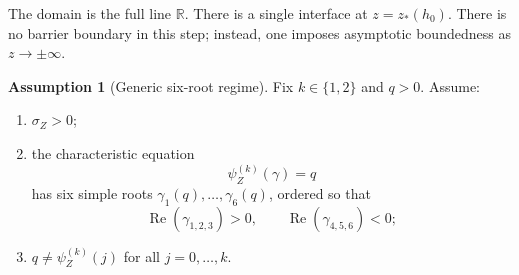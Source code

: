 \documentclass{article}
\newcommand{\R}{\mathbb{R}}
\newcommand{\Rea}{\operatorname{Re}}
\theoremstyle{definition}
\newtheorem{assumption}{Assumption}[section]
\begin{document}
The domain is the full line $\R$. There is a single interface at $z=z_*(h_0)$. There is no barrier boundary in this
step; instead, one imposes asymptotic boundedness as $z\to\pm\infty$.

\begin{assumption}[Generic six-root regime]\label{ass:six-root}
Fix $k\in\{1,2\}$ and $q>0$. Assume:
\begin{enumerate}[label=(\roman*),leftmargin=2em]
\item $\sigma_Z>0$;
\item the characteristic equation
\[
\psi_Z^{(k)}(\gamma)=q
\]
has six simple roots $\gamma_1(q),\dots,\gamma_6(q)$, ordered so that
\[
\Rea(\gamma_{1,2,3})>0,\qquad \Rea(\gamma_{4,5,6})<0;
\]
\item $q\neq \psi_Z^{(k)}(j)$ for all $j=0,\dots,k$.
\end{enumerate}
\end{assumption}
\end{document}
